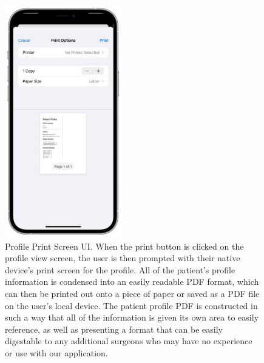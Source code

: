 \documentclass[11pt,letterpaper]{article}
\begin{document}
\begin{figure}
    \centering
    \includegraphics[width=2in]{Screenshots/ps.png}
    \caption{Profile Print Screen UI. When the print button is clicked on the profile view screen, the user is then prompted with their native device's print screen for the profile. All of the patient's profile information is condensed into an easily readable PDF format, which can then be printed out onto a piece of paper or saved as a PDF file on the user's local device. The patient profile PDF is constructed in such a way that all of the information is given its own area to easily reference, as well as presenting a format that can be easily digestable to any additional surgeons who may have no experience or use with our application.}
    \label{fig:printscreen}
\end{figure}




\end{document}
